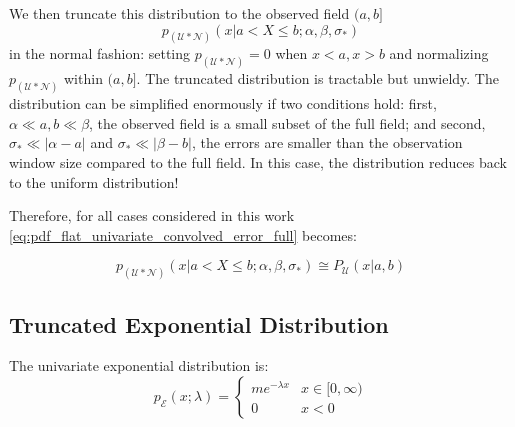 \documentclass[twocolumn, linenumbers]{aastex631}
\newcommand{\mcal}[1]{\mathcal{#1}}
\newcommand{\Exp}[1]{e^{#1}}
\newcommand{\pdf}{p}
\newcommand{\sigobs}{{\sigma_*}}
\begin{document}
        We then truncate this distribution to the observed field $(a, b]$
        \begin{equation} \label{eq:pdf_flat_univariate_convolved_error_full}
            \pdf_{(\mcal{U}*\mcal{N})}(x | a < X \leq b; \alpha, \beta, \sigobs)
        \end{equation}
        in the normal fashion: setting $\pdf_{(\mcal{U}*\mcal{N})} = 0$ when $x
        < a, x > b$ and normalizing $\pdf_{(\mcal{U}*\mcal{N})}$ within $(a,b]$.
        The truncated distribution is tractable but unwieldy. The distribution
        can be simplified enormously if two conditions hold: first, $\alpha \ll
        a, b \ll \beta$, the observed field is a small subset of the full field;
        and second, $\sigobs \ll |\alpha - a|$ and $\sigobs \ll |\beta - b|$,
        the errors are smaller than the observation window size compared to the
        full field.  In this case, the distribution reduces back to the uniform
        distribution!

        Therefore, for all cases considered in this work
        \eqref{eq:pdf_flat_univariate_convolved_error_full} becomes:

        \begin{equation}\label{eq:pdf_flat_univariate_convolved_error}
            \pdf_{(\mcal{U}*\mcal{N})}(x | a < X \leq b; \alpha, \beta, \sigobs) \cong P_{\mcal{U}}(x|a,b)
        \end{equation}
        

    \vspace{10pt}
    \subsection{Truncated Exponential Distribution} \label{app:sub:exponential_distribution}
    
        The univariate exponential distribution is:
        \begin{equation} \label{eq:pdf_exp_univariate}
            \pdf_{\mcal{E}}(x; \lambda) = \begin{cases}
                m \Exp{-\lambda x} & x \in [0, \infty) \\
                0 & x < 0
            \end{cases}
        \end{equation}
    
\end{document}
